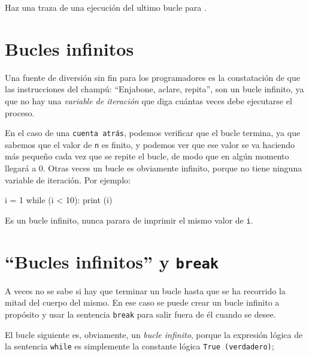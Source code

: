 \begin{exercise}
Haz una traza de una ejecución del ultimo bucle para .
\end{exercise}



\hypertarget{bucles-infinitos}{%
\section{Bucles infinitos}\label{bucles-infinitos}}

Una fuente de diversión sin fin para los programadores es la
constatación de que las instrucciones del champú: ``Enjabone, aclare,
repita'', son un bucle infinito, ya que no hay una \emph{variable de
iteración} que diga cuántas veces debe ejecutarse el proceso.

 

En el caso de una \texttt{cuenta\ atrás}, podemos verificar que el bucle
termina, ya que sabemos que el valor de \texttt{n} es finito, y podemos
ver que ese valor se va haciendo más pequeño cada vez que se repite el
bucle, de modo que en algún momento llegará a 0. Otras veces un bucle es
obviamente infinito, porque no tiene ninguna variable de iteración. Por ejemplo:

\begin{python}[frame=single]
i = 1
while (i < 10):
    print (i)
\end{python}

Es un bucle infinito, nunca parara de imprimir el mismo valor de \verb|i|.





\hypertarget{bucles-infinitos-y-break}{%
\section{\texorpdfstring{``Bucles infinitos'' y
\texttt{break}}{``Bucles infinitos'' y break}}\label{bucles-infinitos-y-break}}

 

A veces no se sabe si hay que terminar un bucle hasta que se ha
recorrido la mitad del cuerpo del mismo. En ese caso se puede crear un
bucle infinito a propósito y usar la sentencia \texttt{break} para salir
fuera de él cuando se desee.

El bucle siguiente es, obviamente, un \emph{bucle infinito}, porque la
expresión lógica de la sentencia \texttt{while} es simplemente la
constante lógica \texttt{True\ (verdadero)};

